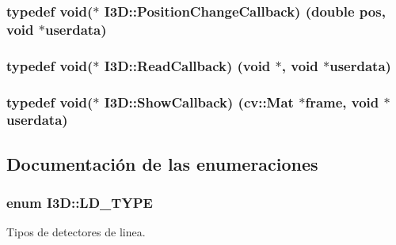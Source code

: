 \subsubsection[{\texorpdfstring{Position\+Change\+Callback}{PositionChangeCallback}}]{\setlength{\rightskip}{0pt plus 5cm}typedef void($\ast$ I3\+D\+::\+Position\+Change\+Callback) (double pos, void $\ast$userdata)}\hypertarget{namespace_i3_d_a923a852719565a9e40df22d8cd71281e}{}\label{namespace_i3_d_a923a852719565a9e40df22d8cd71281e}
\subsubsection[{\texorpdfstring{Read\+Callback}{ReadCallback}}]{\setlength{\rightskip}{0pt plus 5cm}typedef void($\ast$ I3\+D\+::\+Read\+Callback) (void $\ast$, void $\ast$userdata)}\hypertarget{namespace_i3_d_a7005f50d43ac0b10e2f50ab09994f45b}{}\label{namespace_i3_d_a7005f50d43ac0b10e2f50ab09994f45b}
\subsubsection[{\texorpdfstring{Show\+Callback}{ShowCallback}}]{\setlength{\rightskip}{0pt plus 5cm}typedef void($\ast$ I3\+D\+::\+Show\+Callback) (cv\+::\+Mat $\ast$frame, void $\ast$userdata)}\hypertarget{namespace_i3_d_a65da91c3d8b7751e061aa6d8462ea890}{}\label{namespace_i3_d_a65da91c3d8b7751e061aa6d8462ea890}


\subsection{Documentación de las enumeraciones}
\subsubsection[{\texorpdfstring{L\+D\+\_\+\+T\+Y\+PE}{LD_TYPE}}]{\setlength{\rightskip}{0pt plus 5cm}enum {\bf I3\+D\+::\+L\+D\+\_\+\+T\+Y\+PE}\hspace{0.3cm}{\ttfamily [strong]}}\hypertarget{namespace_i3_d_ac3913218d62e4e56ed38931636256ae2}{}\label{namespace_i3_d_ac3913218d62e4e56ed38931636256ae2}


Tipos de detectores de linea. 

